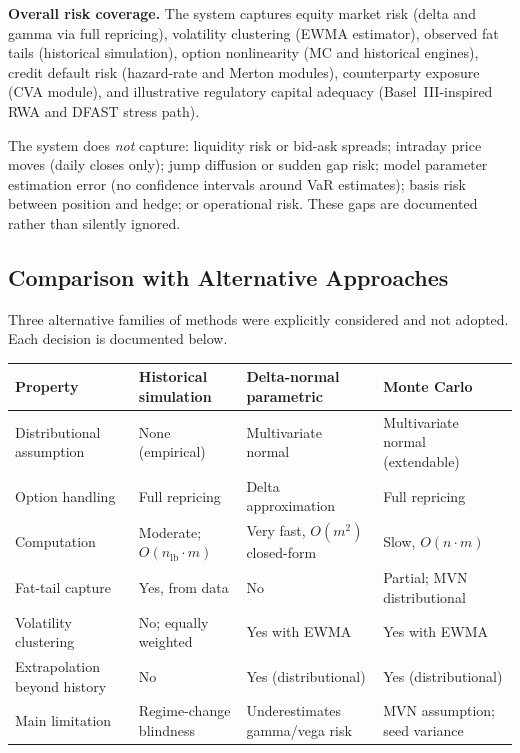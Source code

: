 \documentclass[11pt]{article}
\begin{document}
\textbf{Overall risk coverage.}  The system captures equity market risk
(delta and gamma via full repricing), volatility clustering (EWMA
estimator), observed fat tails (historical simulation), option
nonlinearity (MC and historical engines), credit default risk
(hazard-rate and Merton modules), counterparty exposure (CVA module),
and illustrative regulatory capital adequacy (Basel~III-inspired RWA
and DFAST stress path).

The system does \emph{not} capture: liquidity risk or bid-ask spreads;
intraday price moves (daily closes only); jump diffusion or sudden gap
risk; model parameter estimation error (no confidence intervals around
VaR estimates); basis risk between position and hedge; or operational
risk.  These gaps are documented rather than silently ignored.

\subsection{Comparison with Alternative Approaches}
\label{sec:alternatives}

Three alternative families of methods were explicitly considered and not
adopted.  Each decision is documented below.

\begin{center}
\footnotesize
\begin{tabular}{L{2.6cm}L{3.0cm}L{3.2cm}L{4.0cm}}
\toprule
\textbf{Property}
  & \textbf{Historical simulation}
  & \textbf{Delta-normal parametric}
  & \textbf{Monte Carlo} \\
\midrule
Distributional assumption & None (empirical) & Multivariate normal & Multivariate normal (extendable) \\
Option handling & Full repricing & Delta approximation & Full repricing \\
Computation & Moderate; $O(n_{\text{lb}} \cdot m)$ & Very fast, $O(m^2)$ closed-form & Slow, $O(n \cdot m)$ \\
Fat-tail capture & Yes, from data & No & Partial; MVN distributional \\
Volatility clustering & No; equally weighted & Yes with EWMA & Yes with EWMA \\
Extrapolation beyond history & No & Yes (distributional) & Yes (distributional) \\
Main limitation & Regime-change blindness & Underestimates gamma/vega risk & MVN assumption; seed variance \\
\bottomrule
\end{tabular}
\end{center}
\end{document}
